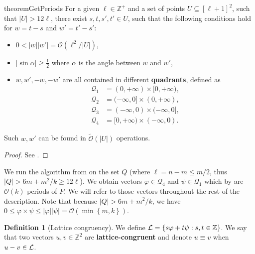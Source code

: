 \documentclass[11pt]{article}
\newcommand{\Z}{\mathbb{Z}}
\renewcommand{\O}{\mathcal{O}}
\newcommand{\tO}{\tilde{\mathcal{O}}}
\renewcommand{\phi}{\varphi}
\newcommand{\set}[1]{\left\lbrace #1 \right\rbrace}
\newcommand{\eq}[1]{\begin{align*} #1 \end{align*}}
\theoremstyle{plain}
\theoremstyle{definition}
\newtheorem{definition}{Definition}
\theoremstyle{remark}
\begin{document}
\newcommand{\Q}{\mathcal{Q}}
\begin{restatable*}{theorem}{GetPeriods}
	\label{get_periods}
	For a given $\ell \in \Z^+$ and a set of points $U \subseteq [\ell + 1]^2$, such that $|U| > 12\ell$, there exist $s, t, s', t' \in U$, such that the following conditions hold for $w = t - s$ and $w' = t' - s'$:
	\begin{itemize}
		\item $0 < |w||w'| = \O(\ell^2 / |U|)$,
		\item $|\sin \alpha| \ge \frac{1}{2}$ where $\alpha$ is the angle between $w$ and $w'$,
		\item $w, w', -w, -w'$ are all contained in different \textbf{quadrants}, defined as
			\eq{
				\Q_1 &= (0, +\infty) \times [0, +\infty), \\
				\Q_2 &= (-\infty, 0] \times (0, +\infty), \\
				\Q_3 &= (-\infty, 0) \times (-\infty, 0], \\
				\Q_4 &= [0, +\infty) \times (-\infty, 0).
			}
	\end{itemize}
	Such $w, w'$ can be found in $\tO(|U|)$ operations.
	\begin{proof} See . \end{proof}
\end{restatable*}


We run the algorithm from  on the set $Q$ (where $\ell = n - m \le m / 2$, thus $|Q| > 6m + m^2/k \ge 12\ell$).
We obtain vectors $\phi \in \Q_4$ and $\psi \in \Q_1$ which by  are $\O(k)$-periods of $P$.
We will refer to those vectors throughout the rest of the description.
Note that because $|Q| > 6m + m^2 / k$, we have $0 \le \phi \times \psi \le |\phi||\psi| = \O(\min\set{m, k})$.


\begin{definition}[Lattice congruency]\label{lattice_congruency}
	We define $\L = \set{s\phi + t\psi : s, t \in \Z}$.
	We say that two vectors $u, v \in \Z^2$ are \textbf{lattice-congruent} and denote $u \equiv v$ when $u - v \in \mathcal{L}$.
\end{definition}
\end{document}

